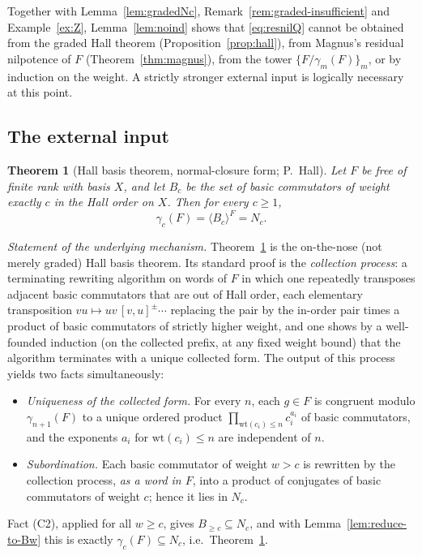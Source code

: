 \documentclass{amsart}
\newtheorem{theorem}{Theorem}
\theoremstyle{definition}
\theoremstyle{remark}
\begin{document}
\noindent
Together with Lemma~\ref{lem:gradedNc}, Remark~\ref{rem:graded-insufficient} and
Example~\ref{ex:Z}, Lemma~\ref{lem:noind} shows that \eqref{eq:resnilQ} cannot be
obtained from the graded Hall theorem (Proposition~\ref{prop:hall}), from Magnus's
residual nilpotence of $F$ (Theorem~\ref{thm:magnus}), from the tower
$\{F/\gamma_m(F)\}_m$, or by induction on the weight. A strictly stronger external
input is logically necessary at this point.

\subsection{The external input}

\begin{theorem}[Hall basis theorem, normal-closure form; P.\ Hall]\label{thm:hall-full}
Let $F$ be free of finite rank with basis $X$, and let $B_c$ be the set of basic
commutators of weight exactly $c$ in the Hall order on $X$. Then for every $c\ge1$,
\[
\gamma_c(F)=\langle B_c\rangle^{F}=N_c .
\]
\end{theorem}

\noindent
\emph{Statement of the underlying mechanism.} Theorem~\ref{thm:hall-full} is the
on-the-nose (not merely graded) Hall basis theorem. Its standard proof is the
\emph{collection process}: a terminating rewriting algorithm on words of $F$ in
which one repeatedly transposes adjacent basic commutators that are out of Hall
order, each elementary transposition $vu\mapsto uv\,[v,u]^{\pm}\cdots$ replacing the
pair by the in-order pair times a product of basic commutators of strictly higher
weight, and one shows by a well-founded induction (on the collected prefix, at any
fixed weight bound) that the algorithm terminates with a unique collected form. The
output of this process yields two facts simultaneously:
\begin{itemize}
\item[(C1)] \emph{Uniqueness of the collected form.} For every $n$, each $g\in F$
is congruent modulo $\gamma_{n+1}(F)$ to a unique ordered product
$\prod_{\mathrm{wt}(c_i)\le n}c_i^{a_i}$ of basic commutators, and the exponents
$a_i$ for $\mathrm{wt}(c_i)\le n$ are independent of $n$.
\item[(C2)] \emph{Subordination.} Each basic commutator of weight $w>c$ is rewritten
by the collection process, \emph{as a word in $F$}, into a product of conjugates of
basic commutators of weight $c$; hence it lies in $N_c$.
\end{itemize}
Fact (C2), applied for all $w\ge c$, gives $B_{\ge c}\subseteq N_c$, and with
Lemma~\ref{lem:reduce-to-Bw} this is exactly $\gamma_c(F)\subseteq N_c$, i.e.\
Theorem~\ref{thm:hall-full}.
\end{document}
